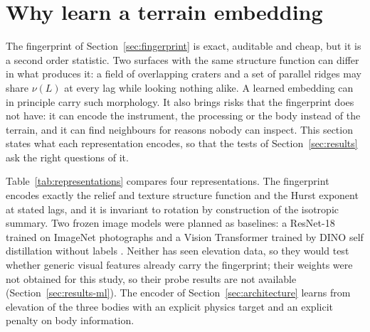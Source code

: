 \section{Why learn a terrain embedding}
\label{sec:embedding}

The fingerprint of Section~\ref{sec:fingerprint} is exact, auditable and cheap, but it is a second
order statistic. Two surfaces with the same structure function can differ in what produces it: a
field of overlapping craters and a set of parallel ridges may share $\nu(L)$ at every lag while
looking nothing alike. A learned embedding can in principle carry such morphology. It also brings
risks that the fingerprint does not have: it can encode the instrument, the processing or the body
instead of the terrain, and it can find neighbours for reasons nobody can inspect. This section
states what each representation encodes, so that the tests of Section~\ref{sec:results} ask the
right questions of it.

Table~\ref{tab:representations} compares four representations. The fingerprint encodes exactly
the relief and texture structure function and the Hurst exponent at stated lags, and it is
invariant to rotation by construction of the isotropic summary. Two frozen image models were
planned as baselines: a ResNet-18 trained on ImageNet photographs \citep{he2015} and a Vision Transformer \citep{dosovitskiy2020} trained by DINO self distillation without labels \citep{caron2021}. Neither has seen
elevation data, so they would test whether generic visual features already carry the fingerprint;
their weights were not obtained for this study, so their probe results are not available
(Section~\ref{sec:results-ml}). The
encoder of Section~\ref{sec:architecture} learns from elevation of the three bodies with an explicit physics target and an explicit penalty on body information.

